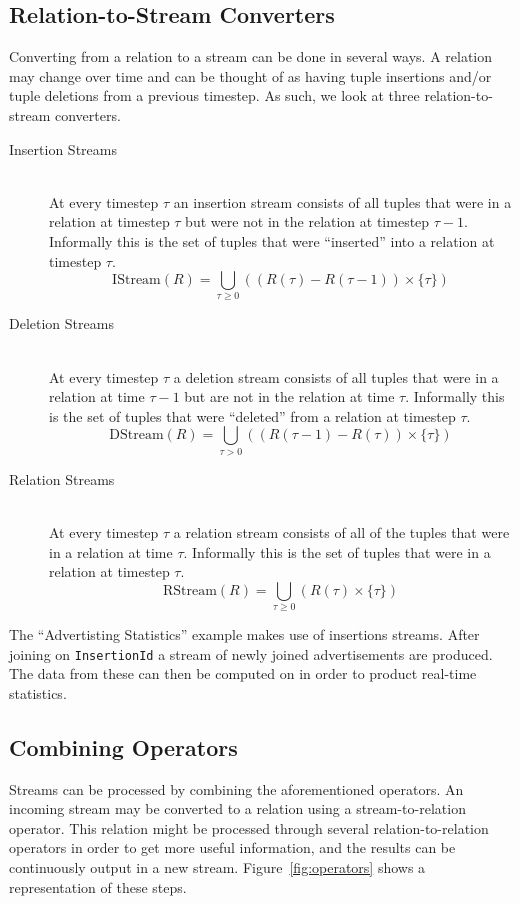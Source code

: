 \documentclass[a4paper, 10pt, conference]{IEEEconf}
\begin{document}
\subsection{Relation-to-Stream Converters}
Converting from a relation to a stream can be done in several ways.  A relation may change over time and can be thought of as having tuple insertions and/or tuple deletions from a previous timestep.  As such, we look at three relation-to-stream converters.  

\begin{description}
    \item[Insertion Streams] \hfill \\
    At every timestep $\tau$ an insertion stream consists of all tuples that were in a relation at timestep $\tau$ but were not in the relation at timestep $\tau - 1$.  Informally this is the set of tuples that were ``inserted'' into a relation at timestep $\tau$.
    $$\text{IStream}(R) = \bigcup_{\tau \geq 0} ((R(\tau) - R(\tau - 1)) \times \{\tau\})$$

    \item[Deletion Streams] \hfill \\
    At every timestep $\tau$ a deletion stream consists of all tuples that were in a relation at time $\tau - 1$ but are not in the relation at time $\tau$. Informally this is the set of tuples that were ``deleted'' from a relation at timestep $\tau$.
    $$\text{DStream}(R) = \bigcup_{\tau > 0} ((R(\tau - 1) - R(\tau)) \times \{\tau\})$$

    \item[Relation Streams] \hfill \\
    At every timestep $\tau$ a relation stream consists of all of the tuples that were in a relation at time $\tau$.  Informally this is the set of tuples that were in a relation at timestep $\tau$.
    $$\text{RStream}(R) = \bigcup_{\tau \geq 0} (R(\tau) \times \{\tau\})$$

\end{description}

The ``Advertisting Statistics'' example makes use of insertions streams.  After joining on \texttt{InsertionId} a stream of newly joined advertisements are produced.  The data from these can then be computed on in order to product real-time statistics.

\subsection{Combining Operators}
Streams can be processed by combining the aforementioned operators.  An incoming stream may be converted to a relation using a stream-to-relation operator.  This relation might be processed through several relation-to-relation operators in order to get more useful information, and the results can be continuously output in a new stream.  Figure~\ref{fig:operators} shows a representation of these steps.
\end{document}
